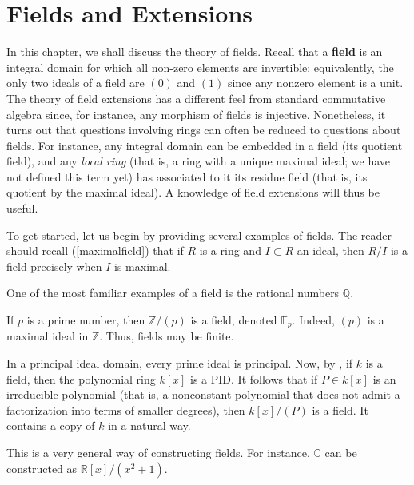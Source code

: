 \chapter{Fields and Extensions}

In this chapter, we shall discuss the theory of fields.
Recall that a \textbf{field} is an integral domain for which all non-zero elements are
invertible; equivalently, the only two ideals of a field are $(0)$ and $(1)$
since any nonzero element is a unit. 
The theory of field extensions has a different feel from standard commutative
algebra since, for instance, any morphism of fields is injective. Nonetheless,
it turns out that questions involving rings can often be reduced to questions
about fields. For instance, any integral domain can be embedded in a field
(its quotient field), and any \emph{local ring} (that is, a ring with a unique
maximal ideal; we have not defined this term yet) has associated to it its
residue field (that is, its quotient by the maximal ideal).
A knowledge of field extensions will thus be useful.


To get started, let us begin by providing several examples of fields. The reader should
recall (\cref{maximalfield}) that if $R$ is a ring and $I \subset R$ an
ideal, then $R/I$ is a field precisely when $I$ is maximal.

\begin{example}
One of the most familiar examples of a field is the rational
numbers $\mathbb{Q}$.
\end{example}

\begin{example}
If $p$ is a prime number, then $\mathbb{Z}/(p)$ is a field, denoted
$\mathbb{F}_p$. Indeed, $(p)$ is a
maximal ideal in $\mathbb{Z}$. Thus, fields may be finite.  
\end{example}


\begin{example} 
In a principal ideal domain, every prime ideal is principal. Now, by
, if $k$ is a field, then the polynomial ring $k[x]$ is a PID. 
It follows that if $P \in k[x]$ is an irreducible polynomial (that is, a
nonconstant polynomial
that does not admit a factorization into terms of smaller degrees), then
$k[x]/(P)$ is a field. It contains a copy of $k$ in a natural way.

This is a very general way of constructing fields. For instance, $\mathbb{C}$
can be constructed as $\mathbb{R}[x]/(x^2 + 1)$.
\end{example} 

